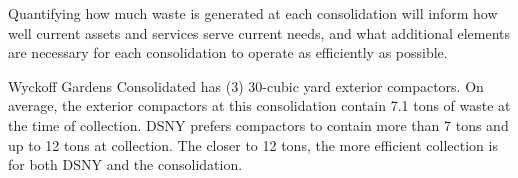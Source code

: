 
    Quantifying how much waste is generated at each consolidation will inform how well current assets and services serve current needs, and what additional elements are necessary for each consolidation to operate as efficiently as possible.
    
    Wyckoff Gardens Consolidated has (3) 30-cubic yard exterior compactors. On average, the exterior compactors at this consolidation contain 7.1 tons of waste at the time of collection. DSNY prefers compactors to contain more than 7 tons and up to 12 tons at collection. The closer to 12 tons, the more efficient collection is for both DSNY and the consolidation.